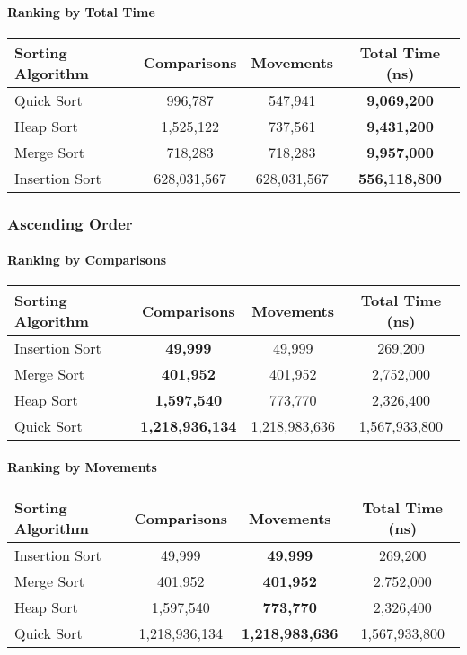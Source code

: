 \documentclass{article}
\begin{document}
\paragraph{Ranking by Total Time}

\begin{longtable}{lccc}
\toprule
\textbf{Sorting Algorithm} & \textbf{Comparisons} & \textbf{Movements} & \textbf{Total Time (ns)} \\
\midrule
Quick Sort     & 996,787     & 547,941     & \textbf{9,069,200}   \\
Heap Sort      & 1,525,122   & 737,561     & \textbf{9,431,200}   \\
Merge Sort     & 718,283     & 718,283     & \textbf{9,957,000}   \\
Insertion Sort & 628,031,567 & 628,031,567 & \textbf{556,118,800} \\
\bottomrule
\end{longtable}

\subsubsection{Ascending Order}

\paragraph{Ranking by Comparisons}

\begin{longtable}{lccc}
\toprule
\textbf{Sorting Algorithm} & \textbf{Comparisons}   & \textbf{Movements} & \textbf{Total Time (ns)} \\
\midrule
Insertion Sort & \textbf{49,999}        & 49,999        & 269,200      \\
Merge Sort     & \textbf{401,952}       & 401,952       & 2,752,000    \\
Heap Sort      & \textbf{1,597,540}     & 773,770       & 2,326,400    \\
Quick Sort     & \textbf{1,218,936,134} & 1,218,983,636 & 1,567,933,800 \\
\bottomrule
\end{longtable}

\paragraph{Ranking by Movements}

\begin{longtable}{lccc}
\toprule
\textbf{Sorting Algorithm} & \textbf{Comparisons}   & \textbf{Movements} & \textbf{Total Time (ns)} \\
\midrule
Insertion Sort & 49,999        & \textbf{49,999}        & 269,200      \\
Merge Sort     & 401,952       & \textbf{401,952}       & 2,752,000    \\
Heap Sort      & 1,597,540     & \textbf{773,770}       & 2,326,400    \\
Quick Sort     & 1,218,936,134 & \textbf{1,218,983,636} & 1,567,933,800 \\
\bottomrule
\end{longtable}
\end{document}
